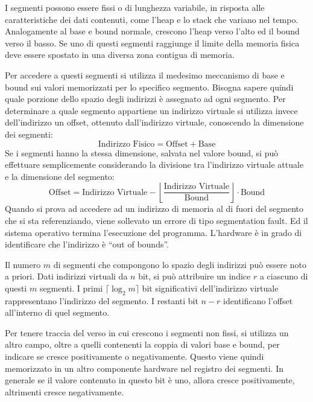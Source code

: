 \documentclass{article}
\numberwithin{equation}{subsection}
\begin{document}
I segmenti possono essere fissi o di lunghezza variabile, in risposta alle caratteristiche dei dati contenuti, come l'heap e lo stack che variano nel tempo. 
Analogamente al base e bound normale, crescono l'heap verso l'alto ed il bound verso il basso. Se uno di questi segmenti raggiunge il limite della memoria fisica deve 
essere spostato in una diversa zona contigua di memoria. 

Per accedere a questi segmenti si utilizza il medesimo meccanismo di base e bound sui valori memorizzati per lo specifico segmento. Bisogna sapere quindi quale porzione 
dello spazio degli indirizzi è assegnato ad ogni segmento. Per determinare a quale segmento appartiene un indirizzo virtuale si utilizza invece dell'indirizzo un 
offset, ottenuto dall'indirizzo virtuale, conoscendo la dimensione dei segmenti:
\begin{equation}
    \text{Indirizzo Fisico}=\text{Offset}+\text{Base}
\end{equation}
Se i segmenti hanno la stessa dimensione, salvata nel valore bound, si può effettuare semplicemente considerando 
la divisione tra l'indirizzo virtuale attuale e la dimensione del segmento:
\begin{equation*}
    \text{Offset}=\text{Indirizzo Virtuale}-\left\lfloor\displaystyle\frac{\text{Indirizzo Virtuale}}{\text{Bound}}\right\rfloor\cdot\text{Bound}
\end{equation*}
Quando si prova ad accedere ad un indirizzo di memoria al di fuori del segmento che si sta referenziando, viene sollevato un errore di 
tipo segmentation fault. Ed il sistema operativo termina l'esecuzione del programma. 
L'hardware è in grado di identificare che l'indirizzo è ``out of bounds''. 

Il numero $m$ di segmenti che compongono lo spazio degli indirizzi può essere noto a priori. Dati indirizzi virtuali da $n$ bit, si può attribuire un indice $r$ a 
ciascuno di questi $m$ segmenti. I primi $\lceil\log_2{m}\rceil$ bit significativi dell'indirizzo virtuale rappresentano l'indirizzo del segmento. I restanti bit $n-r$
identificano l'offset all'interno di quel segmento. 


Per tenere traccia del verso in cui crescono i segmenti non fissi, si utilizza un altro campo, oltre a quelli contenenti la coppia di valori base e bound, per 
indicare se cresce positivamente o negativamente. Questo viene quindi memorizzato in un altro componente hardware nel registro dei segmenti. In generale se il valore 
contenuto in questo bit è uno, allora cresce positivamente, altrimenti cresce negativamente. 
\end{document}
